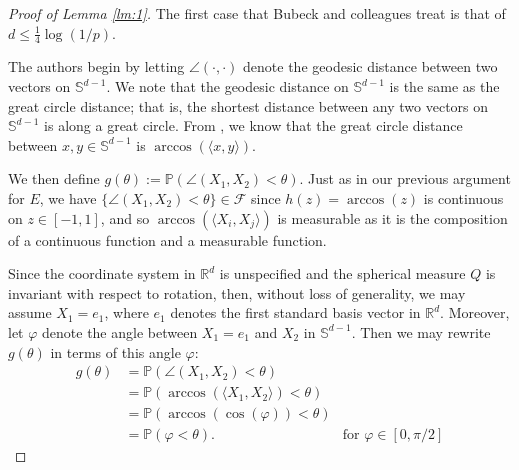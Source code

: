 \documentclass{article}
\begin{document}
\begin{proof}[Proof of Lemma \ref{lm:1}]
The first case that Bubeck and colleagues treat is that of $d \leq \frac{1}{4}\log(1/p)$.

The authors begin by letting $\angle(\cdot, \cdot)$ denote the geodesic distance between two vectors on $\mathbb{S}^{d-1}$. We note that the geodesic distance on $\mathbb{S}^{d-1}$ is the same as the great circle distance; that is, the shortest distance between any two vectors on $\mathbb{S}^{d-1}$ is along a great circle. From \cite{gade2010non}, we know that the great circle distance between $x, y \in \mathbb{S}^{d-1}$ is $\arccos{(\langle x, y \rangle)}.$

We then define $g(\theta) := \mathbb{P}(\angle(X_1, X_2) < \theta)$. Just as in our previous argument for $E$, we have $\{\angle(X_1, X_2) < \theta\} \in \mathcal{F}$ since $h(z) = \arccos(z)$ is continuous on $z \in [-1, 1]$, and so $\arccos( \langle X_i, X_j \rangle)$ is measurable as it is the composition of a continuous function and a measurable function. 

Since the coordinate system in $\mathbb{R}^d$ is unspecified and the spherical measure $Q$ is invariant with respect to rotation, then, without loss of generality, we may assume $X_1 = e_1$, where $e_1$ denotes the first standard basis vector in $\mathbb{R}^d$. Moreover, let $\varphi$ denote the angle between $X_1 = e_1$ and $X_2$ in $\mathbb{S}^{d-1}$. Then we may rewrite $g(\theta)$ in terms of this angle $\varphi$:
\begin{align*}
   g(\theta) &= \mathbb{P} ( \angle (X_1, X_2) < \theta)\\
   &= \mathbb{P}(\arccos (\langle X_1, X_2 \rangle) < \theta)\\
   &= \mathbb{P}(\arccos(\cos(\varphi))< \theta)\\
   &= \mathbb{P}(\varphi < \theta). & \text{for $\varphi \in [0, \pi/2]$}
\end{align*}


\end{proof}
\end{document}
